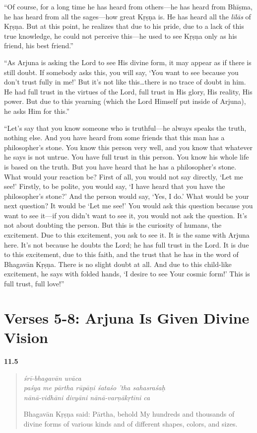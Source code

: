 \enquote{Of course, for a long time he has heard from others---he has heard from Bhīṣma, he has heard from all the sages---how great Kṛṣṇa is. He has heard all the \textit{līlās} of Kṛṣṇa. But at this point, he realizes that due to his pride, due to a lack of this true knowledge, he could not perceive this---he used to see Kṛṣṇa only as his friend, his best friend.}

\enquote{As Arjuna is asking the Lord to see His divine form, it may appear as if there is still doubt. If somebody asks this, you will say, \enquote{You want to see because you don’t trust fully in me!} But it’s not like this\ldots there is no trace of doubt in him. He had full trust in the virtues of the Lord, full trust in His glory, His reality, His power. But due to this yearning (which the Lord Himself put inside of Arjuna), he asks Him for this.}

\enquote{Let’s say that you know someone who is truthful---he always speaks the truth, nothing else. And you have heard from some friends that this man has a philosopher’s stone. You know this person very well, and you know that whatever he says is not untrue. You have full trust in this person. You know his whole life is based on the truth. But you have heard that he has a philosopher’s stone. What would your reaction be? First of all, you would not say directly, \enquote{Let me see!} Firstly, to be polite, you would say, \enquote{I have heard that you have the philosopher’s stone?} And the person would say, \enquote{Yes, I do.} What would be your next question? It would be \enquote{Let me see!} You would ask this question because you want to see it---if you didn’t want to see it, you would not ask the question. It’s not about doubting the person. But this is the curiosity of humans, the excitement. Due to this excitement, you ask to see it. It is the same with Arjuna here. It’s not because he doubts the Lord; he has full trust in the Lord. It is due to this excitement, due to this faith, and the trust that he has in the word of Bhagavān Kṛṣṇa. There is no slight doubt at all. And due to this child-like excitement, he says with folded hands, \enquote{I desire to see Your cosmic form!} This is full trust, full love!}

\section{Verses 5-8: Arjuna Is Given Divine Vision}\label{sec-verses-5-8-arjuna-is-given-divine-vision}


\par\noindent\textbf{11.5}\par
\begin{verse}
\textit{śrī-bhagavān uvāca} \\
\textit{paśya me pārtha rūpāṇi śataśo ’tha sahasraśaḥ} \\
\textit{nānā-vidhāni divyāni nānā-varṇākṛtīni ca}

\noindent Bhagavān Kṛṣṇa said: Pārtha, behold My hundreds and thousands of divine forms of various kinds and of different shapes, colors, and sizes.
\end{verse}
\par



